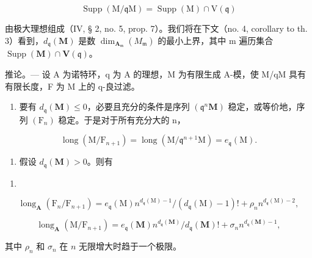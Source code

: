 \[
\operatorname{Supp} (\mathrm{M} / \mathfrak {q} \mathrm{M}) = \operatorname{Supp} (\mathrm{M}) \cap \mathrm{V} (\mathfrak {q})
\]

由极大理想组成（IV, § 2, no. 5, prop. 7）。我们将在下文（no. 4, corollary to th. 3）看到，\(d_{\mathfrak{q}}(\mathbf{M})\) 是数 \(\dim_{\mathbf{A}_{\mathfrak{m}}}(M_{\mathfrak{m}})\) 的最小上界，其中 m 遍历集合 \(\operatorname{Supp}(\mathbf{M}) \cap \mathbf{V}(\mathfrak{q})\)。

推论。— 设 A 为诺特环，q 为 A 的理想，M 为有限生成 A-模，使 M/qM 具有有限长度，F 为 M 上的 q-良过滤。

\begin{enumerate}
\def\labelenumi{\alph{enumi})}
\tightlist
\item
  要有 \(d_{\mathfrak{q}}(\mathbf{M}) \leqslant 0\)，必要且充分的条件是序列 \((\mathfrak{q}^{n}\mathbf{M})\) 稳定，或等价地，序列 \((\mathrm{F}_{n})\) 稳定。于是对于所有充分大的 n，
\end{enumerate}

\[
\operatorname{long} \left(\mathrm{M} / \mathrm{F} _ {n + 1}\right) = \operatorname{long} \left(\mathrm{M} / \mathfrak {q} ^ {n + 1} \mathrm{M}\right) = e _ {\mathfrak {q}} (\mathrm{M}).
\]

\begin{enumerate}
\def\labelenumi{\alph{enumi})}
\setcounter{enumi}{1}
\tightlist
\item
  假设 \(d_{\mathfrak{q}}(\mathbf{M}) > 0\)。则有
\end{enumerate}

\begin{enumerate}
\def\labelenumi{(\arabic{enumi})}
\setcounter{enumi}{12}
\tightlist
\item
\end{enumerate}

\[
\operatorname{long} _ {\mathbf {A}} \left(\mathrm{F} _ {n} / \mathrm{F} _ {n + 1}\right) = e _ {\mathfrak {q}} (\mathrm{M}) n ^ {d _ {\mathfrak {q}} (\mathrm{M}) - 1} / \left(d _ {\mathfrak {q}} (\mathrm{M}) - 1\right)! + \rho_ {n} n ^ {d _ {\mathfrak {q}} (\mathrm{M}) - 2},\tag{14}
\]

\[
\operatorname{long} _ {\mathbf {A}} (\mathrm{M} / \mathrm{F} _ {n + 1}) = e _ {\mathfrak {q}} (\mathbf {M}) n ^ {d _ {\mathfrak {q}} (\mathbf {M})} / d _ {\mathfrak {q}} (\mathbf {M})! + \sigma_ {n} n ^ {d _ {\mathfrak {q}} (\mathbf {M}) - 1},
\]

其中 \(\rho_{n}\) 和 \(\sigma_{n}\) 在 \(n\) 无限增大时趋于一个极限。

